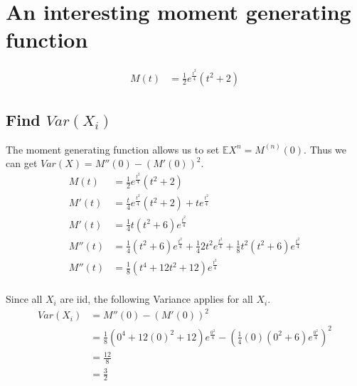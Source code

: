 \documentclass{article}
\newcommand{\expect}{\mathbb{E}}
\begin{document}
\section{An interesting moment generating function}
\begin{align*}
    M(t) &= \frac{1}{2} e^{\frac{t^2}{4}} (t^2+2)
\end{align*}

\subsection{Find $Var(X_i)$}
The moment generating function allows us to set $\expect X^n = M^(n)(0)$.
Thus we can get $Var(X) = M''(0) - (M'(0))^2$.
\begin{align*}
    M(t) &= \frac{1}{2} e^{\frac{t^2}{4}} (t^2+2) \\
    M'(t) &= \frac{t}{4} e^{\frac{t^2}{4}} (t^2+2)
    + t e^{\frac{t^2}{4}} \\
    M'(t) &= \frac{1}{4} t \left(t^2+6\right) e^{\frac{t^2}{4}} \\
    M''(t) &= \frac{1}{4} \left(t^2+6\right) e^{\frac{t^2}{4}}
    + \frac{1}{4} 2t^2 e^{\frac{t^2}{4}}
    + \frac{1}{8} t^2 \left(t^2+6\right) e^{\frac{t^2}{4}} \\
    M''(t) &= \frac{1}{8} \left(t^4 + 12t^2 + 12\right) e^{\frac{t^2}{4}} \\
\end{align*}

Since all $X_i$ are iid, the following Variance applies for all $X_i$.
\begin{align*}
    Var(X_i) &= M''(0) - (M'(0))^2 \\
    &= \frac{1}{8} \left(0^4 + 12(0)^2 + 12\right) e^{\frac{0^2}{4}}
    - \left(\frac{1}{4} (0) \left(0^2+6\right) e^{\frac{0^2}{4}}\right)^2 \\
    &= \frac{12}{8} \\
    &= \frac{3}{2} \\
\end{align*}
\end{document}
